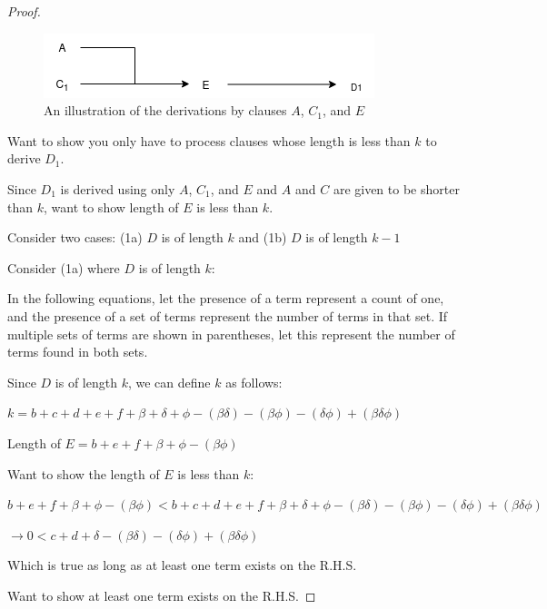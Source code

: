 \documentclass[manuscript]{acmart}
\begin{document}
\begin{proof}
        \begin{figure}[h]
            \includegraphics[scale=0.8]{318b.png}
            \caption{An illustration of the derivations by clauses $A$, $C_1$, and $E$}
        \end{figure}

        Want to show you only have to process clauses whose length is
        less than $k$ to derive $D_1$.

        Since $D_1$ is derived using only $A$, $C_1$, and $E$ and $A$ and $C$ are given to be shorter than $k$, want to show length of $E$ is less than $k$.

        Consider two cases: (1a) $D$ is of length $k$ and 
        (1b) $D$ is of length $k - 1$
        
        Consider (1a) where $D$ is of length $k$:

        In the following equations, let the presence of a term represent a count of one, and the presence of a set of terms represent the number of terms in that set. If multiple sets of terms are shown in parentheses, let this represent the number of terms found in both sets.

        Since $D$ is of length $k$, we can define $k$ as follows:

        $k = b + c + d + e + f + \beta + \delta + \phi - (\beta \delta) 
        - (\beta \phi) - (\delta \phi) + (\beta \delta \phi)$

        Length of $E = b + e + f + \beta + \phi - (\beta \phi)$
        
        Want to show the length of $E$ is less than $k$:

        $b + e + f + \beta + \phi - (\beta \phi) < b + c + d + e + f + 
        \beta + \delta + \phi - (\beta \delta) - (\beta \phi) - (\delta \phi) + (\beta \delta \phi)$

        $\rightarrow 0 < c + d + \delta - (\beta \delta) 
        - (\delta \phi) + (\beta \delta \phi)$

        Which is true as long as at least one term exists on the R.H.S.

        Want to show at least one term exists on the R.H.S.


\end{proof}
\end{document}
